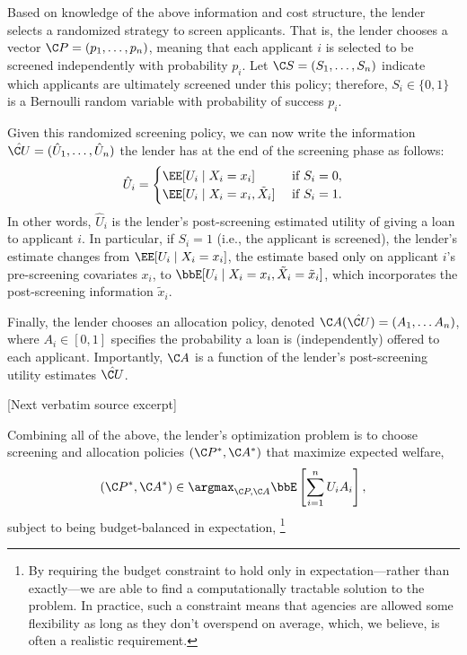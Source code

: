 \documentclass[10pt]{article}
\begin{document}
\begin{ReviewVerbatim}
Based on knowledge of the above information and cost structure, the lender selects a randomized strategy to screen applicants.
That is, the lender chooses a vector
\(\C P = (p_1, \dots, p_n)\), meaning that each applicant \(i\) is selected to be screened independently with probability \(p_i\).
Let \(\C S = (S_1, \dots, S_n)\) indicate which applicants are ultimately screened under this policy; therefore, \(S_i \in \{0,1\}\) is a Bernoulli random variable with probability of success \(p_i\).

Given this randomized screening policy, we can now write the information \(\hat {\C U} = (\hat U_1, \ldots, \hat U_n)\) the lender has at the end of the screening phase as follows:
    \begin{equation}
        \hat U_i = \begin{cases}
            \EE[U_i \mid X_i = x_i] & \text{ if } S_i = 0, \\
            \EE[U_i \mid X_i = x_i, \tilde{X}_i] & \text{ if } S_i =1.
        \end{cases}
    \end{equation}
In other words, \(\hat U_i\) is the lender's post-screening estimated utility of giving a loan to applicant \(i\).
In particular, if \(S_i = 1\) (i.e., the applicant is screened), the lender's estimate changes from \(\EE[U_i\mid X_i = x_i]\),
the estimate based only on applicant \(i\)'s pre-screening covariates \(x_i\),
to
\(\bbE[U_i \mid X_i = x_i, \tilde{X}_i = \tilde{x}_i] \), which incorporates the post-screening information \(\tilde{x}_i\).

Finally, the lender chooses an allocation policy, denoted \(\C A(\hat {\C U}) = (A_1, \dots A_n)\),
where \(A_i \in [0,1]\)
specifies the probability a loan is (independently) offered to each applicant.
Importantly, \(\C A\) is a function of
the lender's post-screening utility estimates
\(\hat {\C U}\).

[Next verbatim source excerpt]

Combining all of the above, the lender's optimization problem is to choose screening and allocation policies \((\C P^*, \C A^*)\) that maximize expected welfare,
\begin{equation}
\label{eq:def1}
    (\C P^*, \C A^*) \in \argmax_{\C P, \C A} \bbE\left[\sum_{i = 1}^n U_i A_i\right],
\end{equation}
subject to being budget-balanced in expectation,%
\footnote{By requiring the budget constraint to hold only in expectation---rather than exactly---we are able to find a computationally tractable solution to the problem. In practice, such a constraint means that agencies are allowed some flexibility as long as they don't overspend on average,
which, we believe, is often a realistic requirement.
}


\end{ReviewVerbatim}
\end{document}
